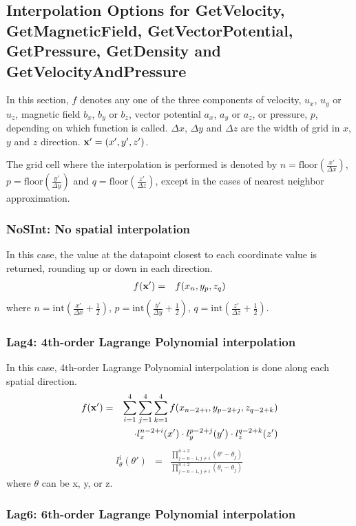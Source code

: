 \documentclass[11pt]{article}
\def\bea{\begin{eqnarray}}
\def\eea{\end{eqnarray}}
\begin{document}
\subsection{Interpolation Options for GetVelocity, GetMagneticField, GetVectorPotential, GetPressure, GetDensity and GetVelocityAndPressure}
In this section, $f$ denotes any one of the three components of
velocity, $u_x$, $u_y$ or $u_z$, magnetic field $b_x$, $b_y$ or $b_z$, vector potential $a_x$, $a_y$ or $a_z$, or pressure, $p$,  depending on which
function is called. $\Delta x$, $\Delta y$ and $\Delta z$ are the
width of grid in $x$, $y$ and $z$ direction. ${\bf x'}=(x',y',z')$.

The grid cell where the interpolation is performed is denoted by
$n = \textrm{floor}\left(\frac{x'}{\Delta x}\right)$,
$p = \textrm{floor}\left(\frac{y'}{\Delta y}\right)$ and
$q = \textrm{floor}\left(\frac{z'}{\Delta z}\right)$,
except in the cases of nearest neighbor approximation.
\subsubsection*{NoSInt: No spatial  interpolation}
\label{sec-noint}
In this case, the value at the datapoint closest to each
coordinate value is returned, rounding up or down in each
direction. \bea f({\bf x'}) &=& f(x_n,y_p,z_q)\eea where
$n=\textrm{int}(\frac{x'}{\Delta x}+\frac{1}{2})$,
$p=\textrm{int}(\frac{y'}{\Delta y}+\frac{1}{2})$,
$q=\textrm{int}(\frac{z'}{\Delta z}+\frac{1}{2})$.


\subsubsection*{Lag4: 4th-order Lagrange Polynomial interpolation}

In this case, 4th-order Lagrange Polynomial interpolation is done along each spatial direction.
\bea f({\bf x'}) &=&
\sum_{i=1}^4\sum_{j=1}^4\sum_{k=1}^4f(x_{n-2+i},y_{p-2+j},z_{q-2+k})\nonumber\\
&&\cdot l_x^{n-2+i}(x')\cdot l_y^{p-2+j}(y')\cdot
l_z^{q-2+k}(z')\eea \bea l_\theta^i(\theta') &=&
\frac{\prod\limits_{j=n-1,j\neq
i}^{n+2}(\theta'-\theta_j)}{\prod\limits_{j=n-1,j\neq
i}^{n+2}(\theta_i-\theta_j)}\eea where $\theta$ can be x, y, or z.

\subsubsection*{Lag6: 6th-order Lagrange Polynomial interpolation}
\end{document}
